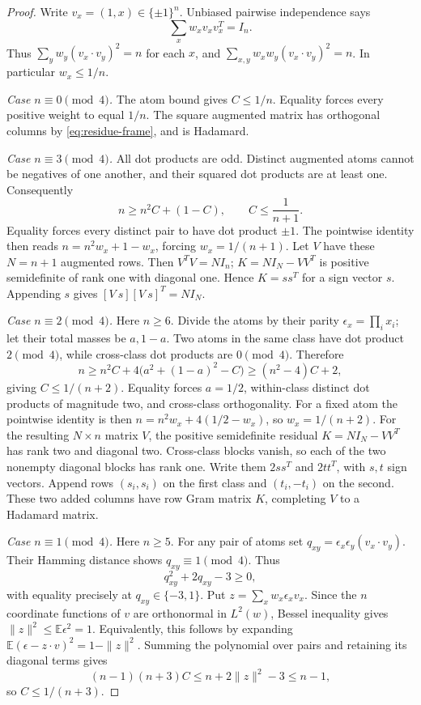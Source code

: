 \begin{proof}
Write $v_x=(1,x)\in\{\pm1\}^n$. Unbiased pairwise independence says
\begin{equation}\label{eq:residue-frame}
 \sum_xw_xv_xv_x^T=I_n.
\end{equation}
Thus $\sum_yw_y(v_x\cdot v_y)^2=n$ for each $x$, and
$\sum_{x,y}w_xw_y(v_x\cdot v_y)^2=n$.
In particular $w_x\le1/n$.

\emph{Case $n\equiv0\pmod4$.}
The atom bound gives $C\le1/n$. Equality forces every positive weight
to equal $1/n$. The square augmented matrix has orthogonal columns
by \eqref{eq:residue-frame}, and is Hadamard.

\emph{Case $n\equiv3\pmod4$.}
All dot products are odd. Distinct augmented atoms cannot be negatives
of one another, and their squared dot products are at least one.
Consequently
\[
 n\ge n^2C+(1-C),\qquad C\le\frac1{n+1}.
\]
Equality forces every distinct pair to have dot product $\pm1$.
The pointwise identity then reads
$n=n^2w_x+1-w_x$, forcing $w_x=1/(n+1)$.
Let $V$ have these $N=n+1$ augmented rows. Then $V^TV=NI_n$;
$K=NI_N-VV^T$ is positive semidefinite of rank one with diagonal
one. Hence $K=ss^T$ for a sign vector $s$. Appending $s$ gives
$[V\ s][V\ s]^T=NI_N$.

\emph{Case $n\equiv2\pmod4$.}
Here $n\ge6$. Divide the atoms by their parity
$\epsilon_x=\prod_i x_i$; let their total masses be $a,1-a$.
Two atoms in the same class have dot product $2\pmod4$, while
cross-class dot products are $0\pmod4$. Therefore
\[
 n\ge n^2C+4\big(a^2+(1-a)^2-C\big)
       \ge(n^2-4)C+2,
\]
giving $C\le1/(n+2)$. Equality forces $a=1/2$, within-class
distinct dot products of magnitude two, and cross-class orthogonality.
For a fixed atom the pointwise identity is then
$n=n^2w_x+4(1/2-w_x)$, so $w_x=1/(n+2)$.
For the resulting $N\times n$ matrix $V$, the positive semidefinite
residual $K=NI_N-VV^T$ has rank two and diagonal two. Cross-class
blocks vanish, so each of the two nonempty diagonal blocks has rank
one. Write them $2ss^T$ and $2tt^T$, with $s,t$ sign vectors.
Append rows $(s_i,s_i)$ on the first class and $(t_i,-t_i)$ on the
second. These two added columns have row Gram matrix $K$, completing
$V$ to a Hadamard matrix.

\emph{Case $n\equiv1\pmod4$.}
Here $n\ge5$. For any pair of atoms set
$q_{xy}=\epsilon_x\epsilon_y(v_x\cdot v_y)$.
Their Hamming distance shows $q_{xy}\equiv1\pmod4$. Thus
\[
 q_{xy}^2+2q_{xy}-3\ge0,
\]
with equality precisely at $q_{xy}\in\{-3,1\}$.
Put $z=\sum_xw_x\epsilon_xv_x$. Since the $n$ coordinate functions
of $v$ are orthonormal in $L^2(w)$, Bessel inequality gives
$\|z\|^2\le\mathbb E\epsilon^2=1$. Equivalently, this follows by
expanding $\mathbb E(\epsilon-z\cdot v)^2=1-\|z\|^2$.
Summing the polynomial over pairs and retaining its diagonal terms gives
\[
 (n-1)(n+3)C\le n+2\|z\|^2-3\le n-1,
\]
so $C\le1/(n+3)$.


\end{proof}
